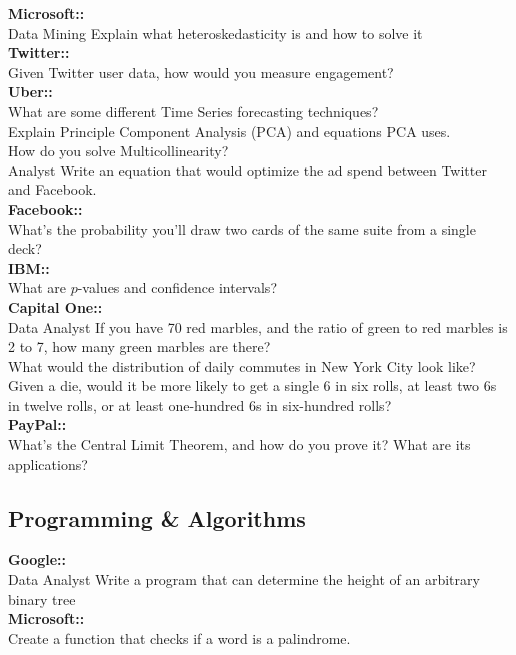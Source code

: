 \documentclass[11pt]{article}
\begin{document}
{\bf Microsoft:: }\\
Data Mining Explain what heteroskedasticity is and how to solve it\\

{\bf Twitter:: }\\
Given Twitter user data, how would you measure engagement?\\

{\bf Uber:: }\\
What are some different Time Series forecasting techniques? \\
Explain Principle Component Analysis (PCA) and equations PCA uses.\\
How do you solve Multicollinearity? \\
Analyst Write an equation that would optimize the ad spend between Twitter and Facebook.\\

{\bf Facebook:: }\\
What’s the probability you’ll draw two cards of the same suite from a single deck?\\

{\bf IBM:: }\\
What are $p$-values and confidence intervals?\\

{\bf Capital One:: }\\
Data Analyst If you have 70 red marbles, and the ratio of green to red marbles is 2 to 7, how many green marbles are there?\\
What would the distribution of daily commutes in New York City look like?\\
Given a die, would it be more likely to get a single 6 in six rolls, at least two 6s in twelve rolls, or at least one-hundred 6s in six-hundred rolls?\\

{\bf PayPal:: }\\
What’s the Central Limit Theorem, and how do you prove it? What are its applications?\\


\subsection{Programming \& Algorithms}
{\bf Google:: }\\
Data Analyst Write a program that can determine the height of an arbitrary binary tree\\

{\bf Microsoft:: }\\
Create a function that checks if a word is a palindrome. \\
\end{document}

